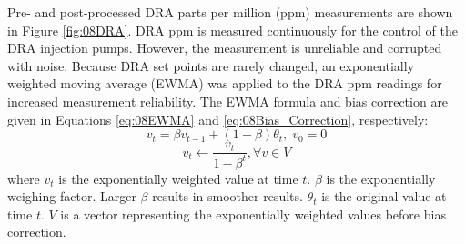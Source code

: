 Pre- and post-processed DRA parts per million (ppm) measurements are shown in Figure \ref{fig:08DRA}. DRA ppm is measured continuously for the control of the DRA injection pumps. However, the measurement is unreliable and corrupted with noise. Because DRA set points are rarely changed, an exponentially weighted moving average (EWMA) was applied to the DRA ppm readings for increased measurement reliability.  The EWMA formula and bias correction are given in Equations \ref{eq:08EWMA} and \ref{eq:08Bias_Correction}, respectively: 
\begin{equation}
    v_t = \beta v_{t - 1} + (1 - \beta) \theta_t, \; v_0 = 0
    \label{eq:08EWMA}
\end{equation}
\begin{equation}
    v_t \leftarrow \frac{v_t}{1 - \beta^t}, \forall v \in V
    \label{eq:08Bias_Correction}
\end{equation}
where $v_{t}$ is the exponentially weighted value at time $t$.  $\beta$ is the exponentially weighing factor.  Larger $\beta$ results in smoother results.  $\theta_t$ is the original value at time $t$. $V$ is a vector representing the exponentially weighted values before bias correction.

